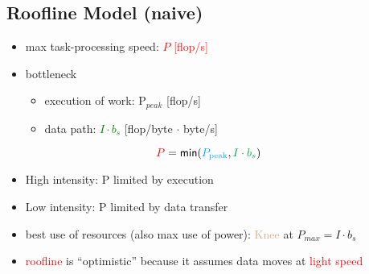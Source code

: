 \documentclass[8pt,a4paper,landscape]{extarticle}
\begin{document}
\pagestyle{empty}

\begin{multicols*}{3}
% 
% 
% 
% 

% 

% 
% 
% 
% 

% 
% 

% 

\section*{Roofline Model (naive)}
\begin{minipage}{.6\linewidth}
  \flushleft
  \begin{itemize}
  \item max task-processing speed: \textcolor{red}{$P$ [flop/s]}
  \item bottleneck
    \begin{itemize}[label=-]
    \item execution of work: P$_{peak}$ [flop/s]
    \item data path: \textcolor{Green}{$I\cdot b_s$} [flop/byte $\cdot$ byte/s]
    \end{itemize}
  \end{itemize}
\[
\textcolor{red}{P} = \textsf{min}(\textcolor{Cyan}{P_{\text{peak}}}, \textcolor{Green}{I\cdot b_{s}})
\]
  \begin{itemize}
  \item High intensity: P limited by execution
  \item Low intensity: P limited by data transfer
  \item best use of resources (also max use of power): \textcolor{Tan}{Knee} at $P_{max} = I \cdot b_s$
  \item \textcolor{red}{roofline} is ``optimistic'' because it assumes data moves at \textcolor{red}{light speed}
  \end{itemize}
\end{minipage}
\begin{minipage}{.4\linewidth}
\end{minipage}
\end{multicols*}
\end{document}

